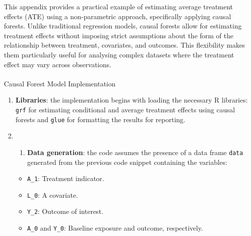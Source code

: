 \documentclass[
  singlecolumn]{article}
\makeatletter
\let\oldparagraph\paragraph
\renewcommand{\paragraph}{
    \@ifstar
      \xxxParagraphStar
      \xxxParagraphNoStar
  }
\newcommand{\xxxParagraphStar}[1]{\oldparagraph*{#1}\mbox{}}
\newcommand{\xxxParagraphNoStar}[1]{\oldparagraph{#1}\mbox{}}
\providecommand{\tightlist}{%
  \setlength{\itemsep}{0pt}\setlength{\parskip}{0pt}}\usepackage{longtable,booktabs,array}
\makeatother
\begin{document}
This appendix provides a practical example of estimating average
treatment effects (ATE) using a non-parametric approach, specifically
applying causal forests. Unlike traditional regression models, causal
forests allow for estimating treatment effects without imposing strict
assumptions about the form of the relationship between treatment,
covariates, and outcomes. This flexibility makes them particularly
useful for analysing complex datasets where the treatment effect may
vary across observations.

\paragraph{Causal Forest Model
Implementation}\label{causal-forest-model-implementation}

\begin{enumerate}
\def\labelenumi{\arabic{enumi}.}
\item
  \textbf{Libraries}: the implementation begins with loading the
  necessary R libraries: \texttt{grf} for estimating conditional and
  average treatment effects using causal forests and \texttt{glue} for
  formatting the results for reporting.
\item
  \begin{enumerate}
  \def\labelenumii{\arabic{enumii}.}
  \tightlist
  \item
    \textbf{Data generation}: the code assumes the presence of a data
    frame \texttt{data} generated from the previous code snippet
    containing the variables:
  \end{enumerate}

  \begin{itemize}
  \tightlist
  \item
    \texttt{A\_1}: Treatment indicator.
  \item
    \texttt{L\_0}: A covariate.
  \item
    \texttt{Y\_2}: Outcome of interest.
  \item
    \texttt{A\_0} and \texttt{Y\_0}: Baseline exposure and outcome,
    respectively.
  \end{itemize}


\end{enumerate}
\end{document}
